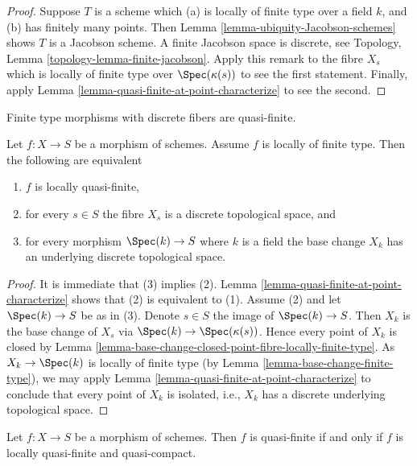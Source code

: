 \begin{proof}
Suppose $T$ is a scheme which (a) is locally of finite type
over a field $k$, and (b) has finitely many points. Then
Lemma \ref{lemma-ubiquity-Jacobson-schemes} shows $T$ is a
Jacobson scheme. A finite Jacobson space is discrete, see
Topology, Lemma \ref{topology-lemma-finite-jacobson}.
Apply this remark to the fibre $X_s$ which is locally of finite type over
$\Spec(\kappa(s))$ to see the first statement. Finally, apply
Lemma \ref{lemma-quasi-finite-at-point-characterize} to see the second.
\end{proof}

\begin{lemma}
\label{lemma-locally-quasi-finite-fibres}
\begin{slogan}
Finite type morphisms with discrete fibers are quasi-finite.
\end{slogan}
Let $f : X \to S$ be a morphism of schemes.
Assume $f$ is locally of finite type.
Then the following are equivalent
\begin{enumerate}
\item $f$ is locally quasi-finite,
\item for every $s \in S$ the fibre $X_s$ is a discrete topological space, and
\item for every morphism $\Spec(k) \to S$ where $k$ is a field
the base change $X_k$ has an underlying discrete topological space.
\end{enumerate}
\end{lemma}

\begin{proof}
It is immediate that (3) implies (2).
Lemma \ref{lemma-quasi-finite-at-point-characterize}
shows that (2) is equivalent to (1).
Assume (2) and let $\Spec(k) \to S$ be as in (3).
Denote $s \in S$ the image  of $\Spec(k) \to S$.
Then $X_k$ is the base change of $X_s$ via
$\Spec(k) \to \Spec(\kappa(s))$. Hence every
point of $X_k$ is closed by
Lemma \ref{lemma-base-change-closed-point-fibre-locally-finite-type}.
As $X_k \to \Spec(k)$ is locally of finite type (by
Lemma \ref{lemma-base-change-finite-type}),
we may apply
Lemma \ref{lemma-quasi-finite-at-point-characterize}
to conclude that every point of $X_k$ is isolated, i.e., $X_k$ has
a discrete underlying topological space.
\end{proof}

\begin{lemma}
\label{lemma-quasi-finite-locally-quasi-compact}
Let $f : X \to S$ be a morphism of schemes.
Then $f$ is quasi-finite if and only if $f$ is
locally quasi-finite and quasi-compact.
\end{lemma}

